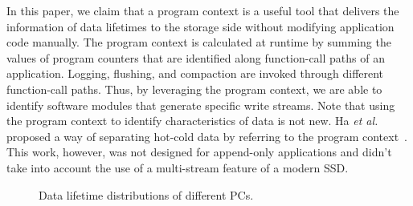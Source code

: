 In this paper, we claim that a program context is a useful tool that delivers
the information of data lifetimes to the storage side without modifying application
code manually. The program context is calculated at runtime by summing the
values of program counters that are identified along function-call paths
of an application.  Logging, flushing, and compaction are invoked through
different function-call paths.  Thus, by leveraging the program context, we are
able to identify software modules that generate specific write streams.  Note
that using the program context to identify characteristics of data is not new.
Ha \textit{et al.} proposed a way of separating hot-cold data by referring to the program
context~\cite{PCHa}. This work, however, was not designed for append-only
applications and didn't take into account the use of a multi-stream feature of
a modern SSD.

\begin{figure}[!t]
\centering
\hspace{1pt}
\hfill
\vspace{-10pt}
\caption{Data lifetime distributions of different PCs.} 
\label{fig:types_and_PCs}
\vspace{-15pt}
\end{figure}

